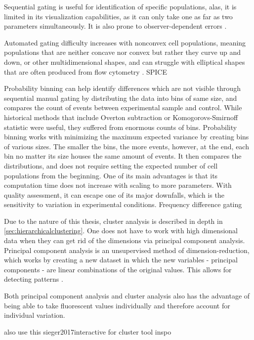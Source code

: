 Sequential gating is useful for identification of specific populations, alas, it is limited in its visualization capabilities, as it can only take one as far as two parameters simultaneously. It is also prone to observer-dependent errors \citep{herzenberg2006interpreting}.

Automated gating difficulty increases with nonconvex cell populations, meaning populations that are neither concave nor convex but rather they curve up and down, or other multidimensional shapes, and can struggle with elliptical shapes that are often produced from flow cytometry \cite{finak2009merging}.
SPICE

Probability binning can help identify differences which are not visible through sequential manual gating by distributing the data into bins of same size, and compares the count of events between experimental sample and control. While historical methods that include Overton subtraction \citep{overton1988modified} or Komogorovs-Smirnoff statistic \citep{young1977proof} were useful, they suffered from enormous counts of bins. Probability binning works with minimizing the maximum expected variance by creating bins of various sizes. The smaller the bins, the more events, however, at the end, each bin no matter its size houses the same amount of events. It then compares the distributions, and does not require setting the expected number of cell populations from the beginning. One of its main advantages is that its computation time does not increase with scaling to more parameters. With quality assessment, it can escape one of its major downfalls, which is the sensitivity to variation in experimental conditions.
Frequency difference gating

Due to the nature of this thesis, cluster analysis is described in depth in \ref{sec:hierarchicalclustering}. 
One does not have to work with high dimensional data when they can get rid of the dimensions via principal component analysis. Principal component analysis is an unsupervised method of dimension-reduction, which works by creating a new dataset in which the new variables - principal components - are linear combinations of the original values. This allows for detecting patterns \citep{rauber2021cerebrospinal}.

Both principal component analysis and cluster analysis also has the advantage of being able to take fluorescent values individually and therefore account for individual variation.


also use this sieger2017interactive for cluster tool inspo 





